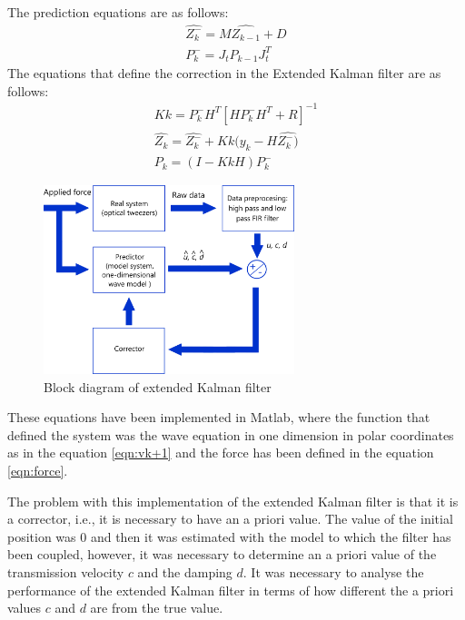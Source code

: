 \documentclass[12pt, a4paper]{article} %
\begin{document}
The prediction equations are as follows:
\setlength{\parskip}{4mm}
\begin{equation} \label{eqn:predictor}
    \begin{array}{ l }

    \hat{Z_{k}^{-}} = M\hat{Z_{k-1}} + D \\
    P_{k}^{-} = J_{t}P_{k-1}J_{t}^{T}
    
    \end{array}
\end{equation}
The equations that define the correction in the Extended Kalman filter are as follows:
\begin{equation} \label{eqn:corrector}
	\begin{array}{ l }
		
		Kk = P_{k}^{-}H^{T}[HP_{k}^{-}H^{T} + R]^{-1} \\
		\hat{Z_{k}} = \hat{Z_{k}^{-}} + Kk(y_{k}-H\hat{Z_{k}^{-})} \\
		P_{k} = (I - KkH)P_{k}^{-}
		
	\end{array}
\end{equation}
\begin{figure}[h!]
	\centering
	\includegraphics[width=0.65\textwidth]{figures/esquema_extended_kalman_filter.png}
	\caption{Block diagram of extended Kalman filter}
	\label{fig:kalman_esq}
\end{figure}

\newpage

These equations have been implemented in Matlab, where the function that defined the system was the wave equation in one dimension in polar coordinates as in the equation \ref{eqn:vk+1} and the force has been defined in the equation \ref{eqn:force}. 

The problem with this implementation of the extended Kalman filter is that it is a corrector, i.e., it is necessary to have an a priori value. The value of the initial position was 0 and then it was estimated with the model to which the filter has been coupled, however, it was necessary to determine an a priori value of the transmission velocity $c$ and the damping $d$. It was necessary to analyse the performance of the extended Kalman filter in terms of how different the a priori values $c$ and $d$ are from the true value.
\end{document}
